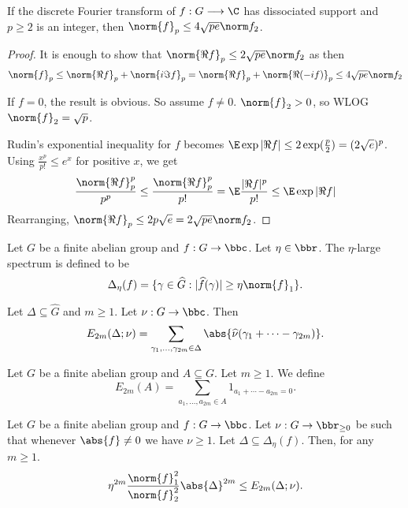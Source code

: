 \begin{lemma}
\label{rudin}
\leanok
If the discrete Fourier transform of $f : G \longrightarrow \C$ has dissociated support and $p \ge 2$ is an integer, then $\norm{f}_p \le 4\sqrt{pe} \norm f_2$.
\end{lemma}
\begin{proof}
\leanok
It is enough to show that $\norm{\Re f}_p \le 2\sqrt{pe} \norm f_2$ as then
$$\norm{f}_p \le \norm{\Re f}_p + \norm{i \Im f}_p = \norm{\Re f}_p + \norm{\Re (-if)}_p \le 4\sqrt{pe} \norm f_2$$

If $f = 0$, the result is obvious. So assume $f \ne 0$. $\norm{f}_2 > 0$, so WLOG $\norm{f}_2 = \sqrt p$.

Rudin's exponential inequality for $f$ becomes $\E \exp|\Re f| \le 2\exp(\frac p 2) = (2\sqrt e)^p$. Using $\frac{x^p}{p!} \le e^x$ for positive $x$, we get
$$\frac{\norm{\Re f}_p^p}{p^p} \le \frac{\norm{\Re f}_p^p}{p!} = \E \frac{|\Re f|^p}{p!} \le \E \exp|\Re f|$$
Rearranging, $\norm{\Re f}_p \le 2 p\sqrt{e} = 2 \sqrt{pe} \norm f_2$.
\end{proof}


\begin{definition}
\label{large_spec}
\leanok
Let $G$ be a finite abelian group and $f:G\to\bbc$. Let $\eta\in \bbr$. The $\eta$-large spectrum is defined to be
\[\Delta_\eta(f) = \{ \gamma\in\widehat{G} : \lvert \widehat{f}(\gamma)\rvert \geq \eta\norm{f}_1\}.\]
\end{definition}


\begin{definition}
\label{weight_energy}
\leanok
Let $\Delta\subseteq \widehat{G}$ and $m\geq 1$. Let $\nu:G\to \bbc$. Then
\[E_{2m}(\Delta;\nu)=\sum_{\gamma_1,\ldots,\gamma_{2m}\in \Delta}\abs{\widehat{\nu}(\gamma_1+\cdots-\gamma_{2m})}.\]
\end{definition}


\begin{definition}[Energy]
\label{energy}
\leanok
Let $G$ be a finite abelian group and $A\subseteq G$. Let $m\geq 1$. We define
\[E_{2m}(A)=\sum_{a_1,\ldots,a_{2m}\in A}1_{a_1+\cdots-a_{2m}=0}.\]
\end{definition}


\begin{lemma}
\label{general_hoelder}
\leanok
Let $G$ be a finite abelian group and $f:G\to\bbc$. Let $\nu:G\to \bbr_{\geq 0}$ be such that whenever $\abs{f}\neq 0$ we have $\nu \geq 1$. Let $\Delta\subseteq \Delta_\eta(f)$. Then, for any $m\geq 1$.
\[\eta^{2m}\frac{\norm{f}_1^2}{\norm{f}_2^2}\abs{\Delta}^{2m}\le E_{2m}(\Delta;\nu).\]
\end{lemma}

